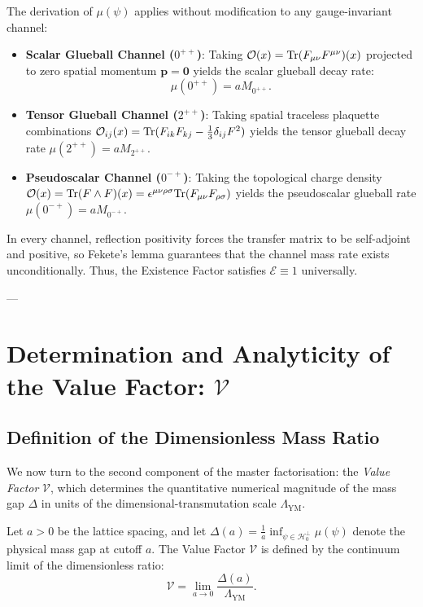 The derivation of $\mu(\psi)$ applies without modification to any gauge-invariant channel:
\begin{itemize}
    \item \textbf{Scalar Glueball Channel ($0^{++}$)}: Taking $\mathcal{O}(x) = \mathrm{Tr}(F_{\mu\nu} F^{\mu\nu})(x)$ projected to zero spatial momentum $\mathbf{p} = \mathbf{0}$ yields the scalar glueball decay rate:
    \begin{equation}
    \mu(0^{++}) = a M_{0^{++}}.
    \end{equation}
    \item \textbf{Tensor Glueball Channel ($2^{++}$)}: Taking spatial traceless plaquette combinations $\mathcal{O}_{ij}(x) = \mathrm{Tr}(F_{ik} F_{kj} - \frac{1}{3}\delta_{ij} F^2)$ yields the tensor glueball decay rate $\mu(2^{++}) = a M_{2^{++}}$.
    \item \textbf{Pseudoscalar Channel ($0^{-+}$)}: Taking the topological charge density $\mathcal{O}(x) = \mathrm{Tr}(F \wedge F)(x) = \epsilon^{\mu\nu\rho\sigma} \mathrm{Tr}(F_{\mu\nu} F_{\rho\sigma})$ yields the pseudoscalar glueball rate $\mu(0^{-+}) = a M_{0^{-+}}$.
\end{itemize}

In every channel, reflection positivity forces the transfer matrix to be self-adjoint and positive, so Fekete's lemma guarantees that the channel mass rate exists unconditionally. Thus, the Existence Factor satisfies $\mathcal{E} \equiv 1$ universally.

---

\section{Determination and Analyticity of the Value Factor: \texorpdfstring{$\mathcal{V}$}{V}}
\label{sec:determination_value_factor}

\subsection{Definition of the Dimensionless Mass Ratio}
\label{subsec:value_factor_ratio_def}

We now turn to the second component of the master factorisation: the \emph{Value Factor} $\mathcal{V}$, which determines the quantitative numerical magnitude of the mass gap $\Delta$ in units of the dimensional-transmutation scale $\Lambda_{\mathrm{YM}}$.

\begin{definition}
\label{def:dimensionless_mass_ratio}
Let $a > 0$ be the lattice spacing, and let $\Delta(a) = \frac{1}{a} \inf_{\psi \in \mathcal{H}_0^\perp} \mu(\psi)$ denote the physical mass gap at cutoff $a$. The Value Factor $\mathcal{V}$ is defined by the continuum limit of the dimensionless ratio:
\begin{equation}
\label{eq:value_factor_def}
\mathcal{V} = \lim_{a \to 0} \frac{\Delta(a)}{\Lambda_{\mathrm{YM}}}.
\end{equation}
\end{definition}

